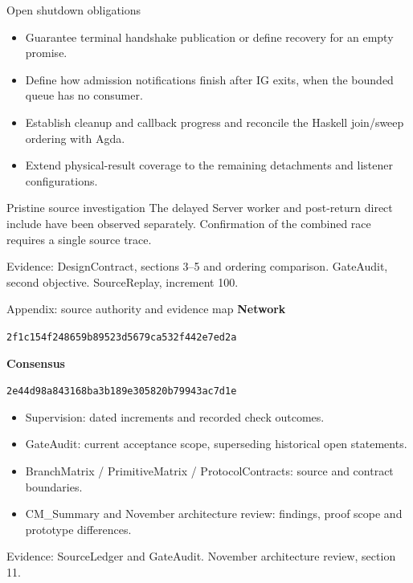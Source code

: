 \documentclass[11pt,aspectratio=169]{beamer}
\newcommand{\evidence}[1]{\vfill{\fontsize{7}{8}\selectfont\color{Muted}Evidence: #1\par}}
\begin{document}
\begin{frame}{Open shutdown obligations}
\begin{itemize}\setlength\itemsep{2.5mm}
\item Guarantee terminal handshake publication or define recovery for an empty promise.
\item Define how admission notifications finish after IG exits, when the bounded queue has no consumer.
\item Establish cleanup and callback progress and reconcile the Haskell join/sweep ordering with Agda.
\item Extend physical-result coverage to the remaining detachments and listener configurations.
\end{itemize}
\begin{alertblock}{Pristine source investigation}
The delayed Server worker and post-return direct include have been observed separately. Confirmation of the combined race requires a single source trace.
\end{alertblock}
\evidence{DesignContract, sections 3--5 and ordering comparison. GateAudit, second objective. SourceReplay, increment 100.}
\end{frame}

\appendix

\begin{frame}{Appendix: source authority and evidence map}
\small
\textbf{Network}\par
\texttt{2f1c154f248659b89523d5679ca532f442e7ed2a}\par\vspace{2mm}
\textbf{Consensus}\par
\texttt{2e44d98a843168ba3b189e305820b79943ac7d1e}\par\vspace{3mm}
\begin{itemize}\setlength\itemsep{2.5mm}
\item Supervision: dated increments and recorded check outcomes.
\item GateAudit: current acceptance scope, superseding historical open statements.
\item BranchMatrix / PrimitiveMatrix / ProtocolContracts: source and contract boundaries.
\item CM\_Summary and November architecture review: findings, proof scope and prototype differences.
\end{itemize}
\evidence{SourceLedger and GateAudit. November architecture review, section 11.}
\end{frame}
\end{document}
